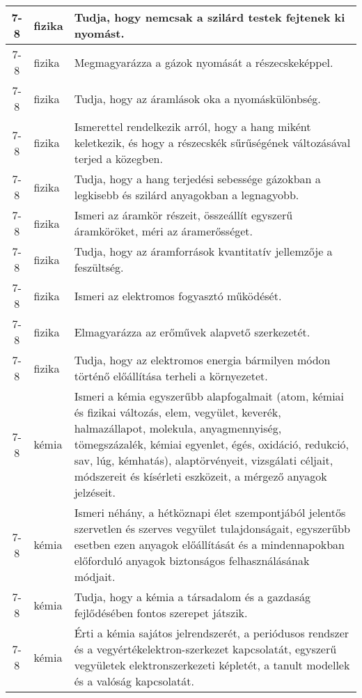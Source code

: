 \begin{small}
\begin{longtable}{c | p{2cm} |  p{11cm} }
              7-8 & fizika & Tudja, hogy nemcsak a szilárd testek fejtenek ki nyomást. \\ \hline
              7-8 & fizika & Megmagyarázza a gázok nyomását a részecskeképpel. \\ \hline
              7-8 & fizika & Tudja, hogy az áramlások oka a nyomáskülönbség. \\ \hline
              7-8 & fizika & Ismerettel rendelkezik arról, hogy a hang miként keletkezik, és hogy a részecskék sűrűségének változásával terjed a közegben. \\ \hline
              7-8 & fizika & Tudja, hogy a hang terjedési sebessége gázokban a legkisebb és szilárd anyagokban a legnagyobb. \\ \hline
              7-8 & fizika & Ismeri az áramkör részeit, összeállít egyszerű áramköröket, méri az áramerősséget. \\ \hline
              7-8 & fizika & Tudja, hogy az áramforrások kvantitatív jellemzője a feszültség. \\ \hline
              7-8 & fizika & Ismeri az elektromos fogyasztó működését. \\ \hline
              7-8 & fizika & Elmagyarázza az erőművek alapvető szerkezetét. \\ \hline
              7-8 & fizika & Tudja, hogy az elektromos energia bármilyen módon történő előállítása terheli a környezetet. \\ \hline
              7-8 & kémia & Ismeri a kémia egyszerűbb alapfogalmait (atom, kémiai és fizikai változás, elem, vegyület, keverék, halmazállapot, molekula, anyagmennyiség, tömegszázalék, kémiai egyenlet, égés, oxidáció, redukció, sav, lúg, kémhatás), alaptörvényeit, vizsgálati céljait, módszereit és kísérleti eszközeit, a mérgező anyagok jelzéseit. \\ \hline
              7-8 & kémia & Ismeri néhány, a hétköznapi élet szempontjából jelentős szervetlen és szerves vegyület tulajdonságait, egyszerűbb esetben ezen anyagok előállítását és a mindennapokban előforduló anyagok biztonságos felhasználásának módjait. \\ \hline
              7-8 & kémia & Tudja, hogy a kémia a társadalom és a gazdaság fejlődésében fontos szerepet játszik. \\ \hline
              7-8 & kémia & Érti a kémia sajátos jelrendszerét, a periódusos rendszer és a vegyértékelektron-szerkezet kapcsolatát, egyszerű vegyületek elektronszerkezeti képletét, a tanult modellek és a valóság kapcsolatát. \\ \hline

\end{longtable}
\end{small}
